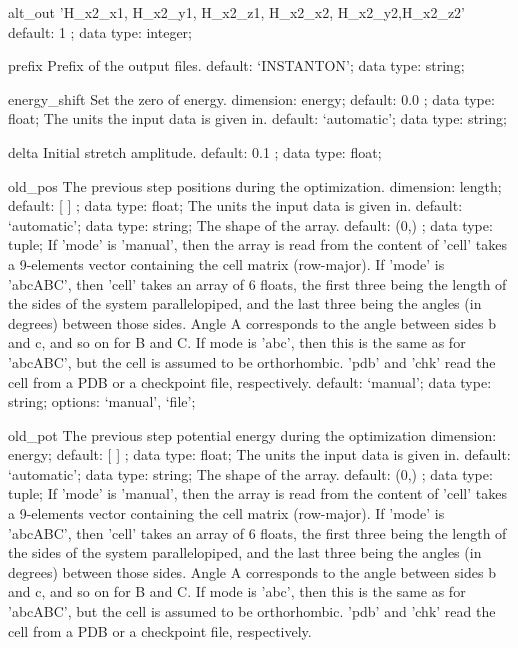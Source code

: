 \begin{ipifield}{}
\begin{ipifield}{alt\_out}
{                                               'H\_x2\_x1, H\_x2\_y1, H\_x2\_z1, H\_x2\_x2, H\_x2\_y2,H\_x2\_z2' }%
{default:  1 ; data type: integer; }%
{}
\end{ipifield}
\begin{ipifield}{prefix}%
{Prefix of the output files.}%
{default: `INSTANTON'; data type: string; }%
{}
\end{ipifield}
\begin{ipifield}{energy\_shift}%
{Set the zero of energy.}%
{dimension: energy; default:  0.0 ; data type: float; }%
{%
{The units the input data is given in.}%
{default: `automatic'; data type: string; }%
}
\end{ipifield}
\begin{ipifield}{delta}%
{Initial stretch amplitude.}%
{default:  0.1 ; data type: float; }%
{}
\end{ipifield}
\begin{ipifield}{old\_pos}%
{The previous step positions during the optimization. }%
{dimension: length; default:  [ ] ; data type: float; }%
{%
{The units the input data is given in.}%
{default: `automatic'; data type: string; }%
%
{The shape of the array.}%
{default:  (0,) ; data type: tuple; }%
%
{If 'mode' is 'manual', then the array is read from the content of 'cell' takes a 9-elements vector containing the cell matrix (row-major). If 'mode' is 'abcABC', then 'cell' takes an array of 6 floats, the first three being the length of the sides of the system parallelopiped, and the last three being the angles (in degrees) between those sides. Angle A corresponds to the angle between sides b and c, and so on for B and C. If mode is 'abc', then this is the same as for 'abcABC', but the cell is assumed to be orthorhombic. 'pdb' and 'chk' read the cell from a PDB or a checkpoint file, respectively.}%
{default: `manual'; data type: string; options: `manual', `file'; }%
}
\end{ipifield}
\begin{ipifield}{old\_pot}%
{The previous step potential energy during the optimization}%
{dimension: energy; default:  [ ] ; data type: float; }%
{%
{The units the input data is given in.}%
{default: `automatic'; data type: string; }%
%
{The shape of the array.}%
{default:  (0,) ; data type: tuple; }%
%
{If 'mode' is 'manual', then the array is read from the content of 'cell' takes a 9-elements vector containing the cell matrix (row-major). If 'mode' is 'abcABC', then 'cell' takes an array of 6 floats, the first three being the length of the sides of the system parallelopiped, and the last three being the angles (in degrees) between those sides. Angle A corresponds to the angle between sides b and c, and so on for B and C. If mode is 'abc', then this is the same as for 'abcABC', but the cell is assumed to be orthorhombic. 'pdb' and 'chk' read the cell from a PDB or a checkpoint file, respectively.}%
}
\end{ipifield}
\end{ipifield}
